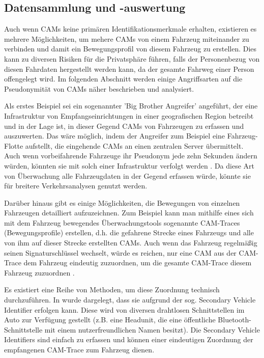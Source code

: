 \subsection{Datensammlung und -auswertung}
\label{sec:FirstContentSection:ThirdSubSection}

Auch wenn CAMs keine primären Identifikationsmerkmale erhalten, existieren es mehrere Möglichkeiten, um mehere CAMs von einem Fahrzeug miteinander zu verbinden und damit ein Bewegungsprofil von diesem Fahrzeug zu erstellen. Dies kann zu diversen Risiken für die Privatsphäre führen, falls der Personenbezug von diesen Fahrdaten hergestellt werden kann, da der gesamte Fahrweg einer Person offengelegt wird. Im folgenden Abschnitt werden einige Angriffsarten auf die Pseudonymität von CAMs näher beschrieben und analysiert. 

Als erstes Beispiel sei ein sogenannter 'Big Brother Angreifer' angeführt, der eine Infrastruktur von Empfangseinrichtungen in einer geografischen Region betreibt und in der Lage ist, in dieser Gegend CAMs von Fahrzeugen zu erfassen und auszuwerten. Das wäre möglich, indem der Angreifer zum Beispiel eine Fahrzeug-Flotte aufstellt, die eingehende CAMs an einen zentralen Server übermittelt. Auch wenn vorbeifahrende Fahrzeuge ihr Pseudonym jede zehn Sekunden ändern würden, könnten sie mit solch einer Infrastruktur verfolgt werden \cite{Wiedersheim2010}. Da diese Art von Überwachung alle Fahrzeugdaten in der Gegend erfassen würde, könnte sie für breitere Verkehrsanalysen genutzt werden.

Darüber hinaus gibt es einige Möglichkeiten, die Bewegungen von einzelnen Fahrzeugen detailliert aufzuzeichnen. Zum Beispiel kann man mithilfe eines sich mit dem Fahrzeug bewegendes Überwachungstools sogenannte CAM-Traces (Bewegungsprofile) erstellen, d.h. die gefahrene Strecke eines Fahrzeugs und alle von ihm auf dieser Strecke erstellten CAMs. Auch wenn das Fahrzeug regelmäßig seinen Signaturschlüssel wechselt, würde es reichen, nur eine CAM aus der CAM-Trace dem Fahrzeug eindeutig zuzuordnen, um die gesamte CAM-Trace diesem Fahrzeug zuzuordnen \cite{Kiometzis2017}. 

Es existiert eine Reihe von Methoden, um diese Zuordnung technisch durchzuführen. In \cite{Ullmann2016} wurde dargelegt, dass sie aufgrund der sog. Secondary Vehicle Identifier erfolgen kann. Diese wird von diversen drahtlosen Schnittstellen im Auto zur Verfügung gestellt (z.B. eine Headunit, die eine öffentliche Bluetooth-Schnittstelle mit einem nutzerfreundlichen Namen besitzt). Die Secondary Vehicle Identifiers sind einfach zu erfassen und können einer eindeutigen Zuordnung der empfangenen CAM-Trace zum Fahrzeug dienen. 

